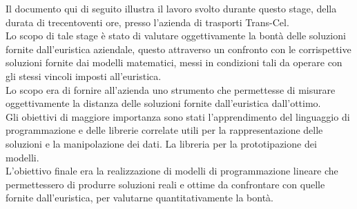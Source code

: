
Il documento qui di seguito illustra il lavoro svolto durante questo stage, della durata di trecentoventi ore, presso l’azienda di trasporti Trans-Cel.\\
Lo scopo di tale stage è stato di valutare oggettivamente la bontà delle soluzioni fornite dall'euristica aziendale, questo attraverso un confronto con le corrispettive soluzioni fornite dai modelli matematici, messi in condizioni tali da operare con gli stessi vincoli imposti all'euristica.\\
Lo scopo era di fornire all'azienda uno strumento che permettesse di misurare oggettivamente la distanza delle soluzioni fornite dall'euristica dall'ottimo.\\
\newline
Gli obiettivi di maggiore importanza sono stati l'apprendimento del linguaggio di programmazione  e delle librerie correlate utili per la rappresentazione delle soluzioni e la manipolazione dei dati. La libreria  per la prototipazione dei modelli.\\
L'obiettivo finale era la realizzazione di modelli di programmazione lineare che permettessero di produrre soluzioni reali e ottime da confrontare con quelle fornite dall'euristica, per valutarne quantitativamente la bontà.